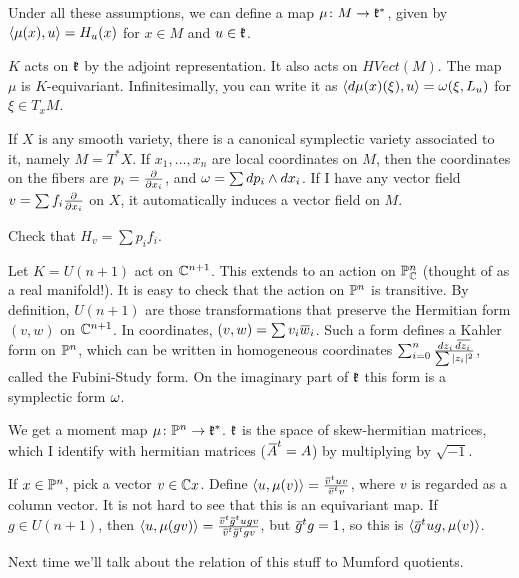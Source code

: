 Under all these assumptions, we can define a map $\mu\colon M\to \mathfrak{k}^*$, given by $\langle\mu(x),u\rangle=H_u(x)$ for $x\in M$ and $u\in \mathfrak{k}$. 
\begin{remark}
 $K$ acts on $\mathfrak{k}$ by the adjoint representation. It also acts on $HVect(M)$. The map $\mu$ is $K$-equivariant. Infinitesimally, you can write it as $\langle d\mu(x)(\xi),u\rangle=\omega(\xi,L_u)$ for $\xi\in T_xM$.
\end{remark}
\begin{example}
 If $X$ is any smooth variety, there is a canonical symplectic variety associated to it, namely $M=T^*X$. If $x_1,\dots, x_n$ are local coordinates on $M$, then the coordinates on the fibers are $p_i=\frac{\partial }{\partial x_i}$, and $\omega=\sum dp_i\wedge dx_i$. If I have any vector field $v=\sum f_i\frac{\partial }{\partial x_i}$ on $X$, it automatically induces a vector field on $M$.
 \begin{exercise}
  Check that $H_v=\sum p_if_i$.
 \end{exercise}
\end{example}
\begin{example}
 Let $K=U(n+1)$ act on $\mathbb{C}^{n+1}$. This extends to an action on $\mathbb{P}^n_{\mathbb{C}}$ (thought of as a real manifold!). It is easy to check that the action on $\mathbb{P}^n$ is transitive. By definition, $U(n+1)$ are those transformations that preserve the Hermitian form $(v,w)$ on $\mathbb{C}^{n+1}$. In coordinates, $(v,w)=\sum v_i\bbar w_i$. Such a form defines a Kahler form on $\mathbb{P}^n$, which can be written in homogeneous coordinates $\sum_{i=0}^n \frac{dz_i\, \bbar{dz_i}}{\sum |z_i|^2}$, called the Fubini-Study form. On the imaginary part of $\mathfrak{k}$ this form is a symplectic form $\omega$.
 
 We get a moment map $\mu\colon \mathbb{P}^n\to \mathfrak{k}^*$. $\mathfrak{k}$ is the space of skew-hermitian matrices, which I identify with hermitian matrices ($\bbar A^t=A$) by multiplying by $\sqrt{-1}$.
 
 If $x\in \mathbb{P}^n$, pick a vector $v\in \mathbb{C} x$. Define $\<u,\mu(v)\>=\frac{\bbar v^t u v}{\bbar v^t v}$, where $v$ is regarded as a column vector. It is not hard to see that this is an equivariant map. If $g\in U(n+1)$, then $\<u,\mu(gv)\>=\frac{\bbar v^t \bbar g^t u g v}{\bbar v^t \bbar g^t gv}$, but $\bbar g^tg=1$, so this is $\<\bbar g^tug,\mu(v)\>$.
\end{example}
Next time we'll talk about the relation of this stuff to Mumford quotients.